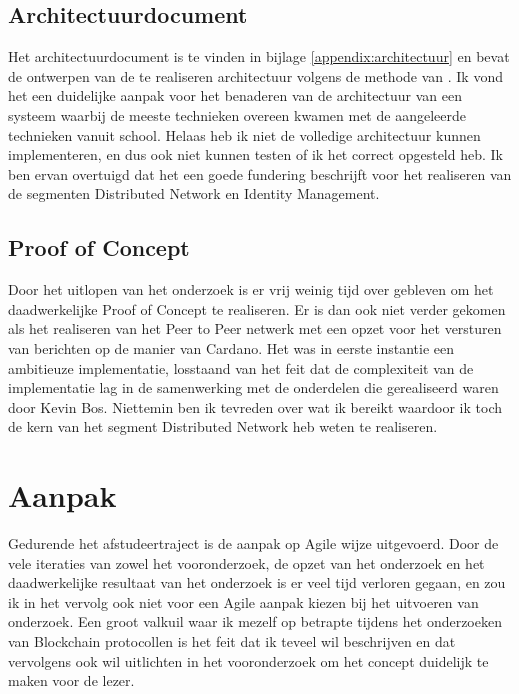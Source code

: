 \newpage

\subsection{Architectuurdocument}

Het architectuurdocument is te vinden in bijlage \ref{appendix:architectuur} en bevat de ontwerpen van de te realiseren architectuur volgens de methode van \citep{kruchten19954+}. Ik vond het een duidelijke aanpak voor het benaderen van de architectuur van een systeem waarbij de meeste technieken overeen kwamen met de aangeleerde technieken vanuit school. Helaas heb ik niet de volledige architectuur kunnen implementeren, en dus ook niet kunnen testen of ik het correct opgesteld heb. Ik ben ervan overtuigd dat het een goede fundering beschrijft voor het realiseren van de segmenten Distributed Network en Identity Management.

\subsection{Proof of Concept}

Door het uitlopen van het onderzoek is er vrij weinig tijd over gebleven om het daadwerkelijke Proof of Concept te realiseren. Er is dan ook niet verder gekomen als het realiseren van het Peer to Peer netwerk met een opzet voor het versturen van berichten op de manier van Cardano. Het was in eerste instantie een ambitieuze implementatie, losstaand van het feit dat de complexiteit van de implementatie lag in de samenwerking met de onderdelen die gerealiseerd waren door Kevin Bos. Niettemin ben ik tevreden over wat ik bereikt waardoor ik toch de kern van het segment Distributed Network heb weten te realiseren.

\section{Aanpak}

Gedurende het afstudeertraject is de aanpak op Agile wijze uitgevoerd. Door de vele iteraties van zowel het vooronderzoek, de opzet van het onderzoek en het daadwerkelijke resultaat van het onderzoek is er veel tijd verloren gegaan, en zou ik in het vervolg ook niet voor een Agile aanpak kiezen bij het uitvoeren van onderzoek. Een groot valkuil waar ik mezelf op betrapte tijdens het onderzoeken van Blockchain protocollen is het feit dat ik teveel wil beschrijven en dat vervolgens ook wil uitlichten in het vooronderzoek om het concept duidelijk te maken voor de lezer.

